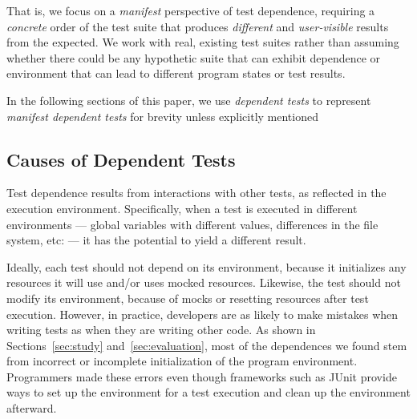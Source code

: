 That is, we focus on a \emph{manifest} perspective of test dependence,
requiring a \emph{concrete} order of the test suite that
produces \emph{different} and \emph{user-visible} results from the expected.  
%
We work with real, existing test suites rather than assuming
whether there could be any hypothetic suite that can exhibit dependence
or environment that can lead to different program states or test results.

In the following sections of this paper, we use \textit{dependent tests}
to represent \textit{manifest dependent tests} for brevity
unless explicitly mentioned





\subsection{Causes of Dependent Tests}


Test dependence results from interactions with other tests, as reflected
in the execution environment.
Specifically, when a
test is executed in different environments --- global variables
with different values, differences in the file system, etc: --- it has the
potential to yield
a different result.  

Ideally, each test should not depend on its environment, because it
initializes any resources it will use and/or uses mocked resources.
Likewise, the test should not modify its environment, because of mocks or
resetting resources after test execution. However, in practice,
developers are as likely
to make mistakes when writing tests as when they are writing other code.
As shown in Sections~\ref{sec:study} and~\ref{sec:evaluation}, most of the dependences we found
stem from incorrect or incomplete initialization
of the program environment.
Programmers made these errors even though frameworks such as
JUnit provide ways to set up the environment for a test execution and clean
up the environment afterward.



